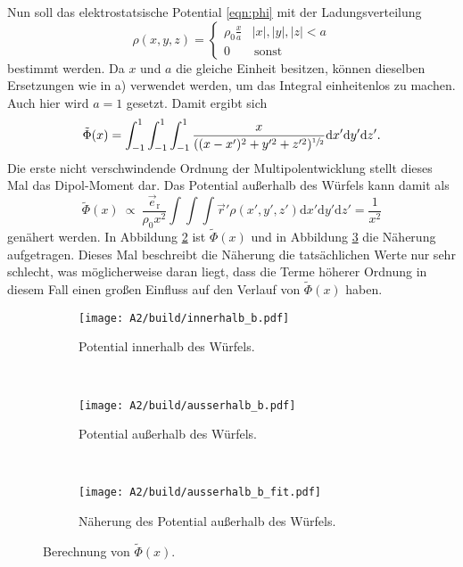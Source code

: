 Nun soll das elektrostatsische Potential \eqref{eqn:phi} mit der Ladungsverteilung
\begin{equation*}
  \rho(x, y, z) = \begin{cases}
  \rho_0 \frac{x}{a} & |x|,|y|,|z| < a \\
  0 &\, \text{sonst}
  \end{cases}
\end{equation*}
bestimmt werden. Da \(x\) und \(a\) die gleiche Einheit besitzen, können dieselben Ersetzungen wie in a) verwendet werden, um das Integral einheitenlos zu machen. Auch hier wird \(a=1\) gesetzt.
Damit ergibt sich
\begin{equation*}
  \tilde{\Phi}(x) = \int_{-1}^1 \int_{-1}^1 \int_{-1}^1 \frac{x}{((x-x')^2+y'^2+z'^2)^{\sfrac{1}{2}}} \mathrm{d}x'\mathrm{d}y'\mathrm{d}z'.
\end{equation*}
Die erste nicht verschwindende Ordnung der Multipolentwicklung stellt dieses Mal das Dipol-Moment dar. Das Potential außerhalb des Würfels kann damit als
\begin{equation*}
  \tilde{\Phi}(x) \: \propto \: \frac{\vec{e}_\text{r}}{\rho_0 x^2} \int \int \int \vec{r}' \rho(x', y', z') \mathrm{d}x'\mathrm{d}y'\mathrm{d}z' = \frac{1}{x^2}
\end{equation*}
genähert werden.
In Abbildung \ref{fig:aus_b} ist \(\tilde{\Phi}(x)\) und in Abbildung \ref{fig:aus_b_fit} die Näherung aufgetragen. Dieses Mal beschreibt die Näherung die tatsächlichen Werte nur sehr schlecht, was möglicherweise daran liegt, dass die Terme höherer Ordnung in diesem Fall einen großen Einfluss auf den Verlauf von \(\tilde{\Phi}(x)\) haben.
\begin{figure}[!h]
  \centering
  \begin{subfigure}[b]{0.45\textwidth}
      \texttt{[image: A2/build/innerhalb\_b.pdf]}
      \caption{Potential innerhalb des Würfels.}
      \label{fig:inn_b}
    \end{subfigure}
    ~ %
    \begin{subfigure}[b]{0.45\textwidth}
      \texttt{[image: A2/build/ausserhalb\_b.pdf]}
      \caption{Potential außerhalb des Würfels.}
      \label{fig:aus_b}
    \end{subfigure}
    ~
    \begin{subfigure}[b]{0.45\textwidth}
      \texttt{[image: A2/build/ausserhalb\_b\_fit.pdf]}
      \caption{Näherung des Potential außerhalb des Würfels.}
      \label{fig:aus_b_fit}
    \end{subfigure}
    \caption{Berechnung von \(\tilde{\Phi}(x)\).}\label{fig:b}
\end{figure}
\FloatBarrier